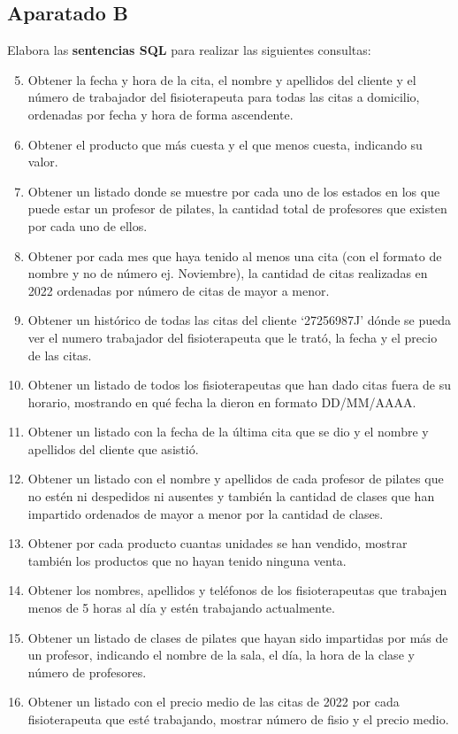 \subsection{Aparatado B}
Elabora las \textbf{sentencias SQL} para realizar las siguientes consultas:

\begin{enumerate}
    \setcounter{enumi}{4}
    \item Obtener la fecha y hora de la cita, el nombre y apellidos del cliente y el número de trabajador del fisioterapeuta para todas las citas a domicilio, ordenadas por fecha y hora de forma ascendente.
    \item Obtener el producto que más cuesta y el que menos cuesta, indicando su valor.
    \item Obtener un listado donde se muestre por cada uno de los estados en los que puede estar un profesor de pilates, la cantidad total de profesores que existen por cada uno de ellos.
    \item Obtener por cada mes que haya tenido al menos una cita (con el formato de nombre y no de número ej. Noviembre), la cantidad de citas realizadas en 2022 ordenadas por número de citas de mayor a menor.
    \item Obtener un histórico de todas las citas del cliente ‘27256987J’ dónde se pueda ver el numero trabajador del fisioterapeuta que le trató, la fecha y el precio de las citas.
    \item Obtener un listado de todos los fisioterapeutas que han dado citas fuera de su horario, mostrando en qué fecha la dieron en formato DD/MM/AAAA.
    \item Obtener un listado con la fecha de la última cita que se dio y el nombre y apellidos del cliente que asistió.
    \item Obtener un listado con el nombre y apellidos de cada profesor de pilates que no estén ni despedidos ni ausentes y también la cantidad de clases que han impartido ordenados de mayor a menor por la cantidad de clases.
    \item Obtener por cada producto cuantas unidades se han vendido, mostrar también los productos que no hayan tenido ninguna venta.
    \item Obtener los nombres, apellidos y teléfonos de los fisioterapeutas que trabajen menos de 5 horas al día y estén trabajando actualmente.
    \item Obtener un listado de clases de pilates que hayan sido impartidas por más de un profesor, indicando el nombre de la sala, el día, la hora de la clase y número de profesores.
    \item Obtener un listado con el precio medio de las citas de 2022 por cada fisioterapeuta que esté trabajando, mostrar número de fisio y el precio medio.
\end{enumerate}

